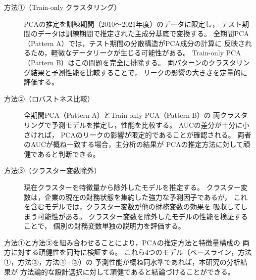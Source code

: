 \begin{description}
  \item[方法①（Train-only クラスタリング）]
    PCAの推定を訓練期間（2010〜2021年度）のデータに限定し，
    テスト期間のデータは訓練期間で推定された主成分基底で変換する。
    全期間PCA（Pattern A）では，テスト期間の分散構造がPCA成分の計算に
    反映されるため，軽微なデータリークが生じる可能性がある。
    Train-only PCA（Pattern B）はこの問題を完全に排除する。
    両パターンのクラスタリング結果と予測性能を比較することで，
    リークの影響の大きさを定量的に評価する。

  \item[方法②（ロバストネス比較）]
    全期間PCA（Pattern A）とTrain-only PCA（Pattern B）の
    両クラスタリングで予測モデルを推定し，性能を比較する。
    AUCの差分が十分に小さければ，
    PCAのリークの影響が限定的であることが確認される。
    両者のAUCが概ね一致する場合，主分析の結果が
    PCAの推定方法に対して頑健であると判断できる。

  \item[方法③（クラスター変数除外）]
    現在クラスターを特徴量から除外したモデルを推定する。
    クラスター変数は，企業の現在の財務状態を集約した強力な予測因子であるが，
    これを含むモデルでは，クラスター変数が他の財務変数の効果を
    吸収してしまう可能性がある。
    クラスター変数を除外したモデルの性能を検証することで，
    個別の財務変数単独の説明力を評価する。
\end{description}

方法①と方法③を組み合わせることにより，PCAの推定方法と特徴量構成の
両方に対する頑健性を同時に検証する。
これら4つのモデル（ベースライン，方法①，方法③，方法①+③）の
予測性能が概ね同水準であれば，本研究の分析結果が
方法論的な設計選択に対して頑健であると結論づけることができる。
